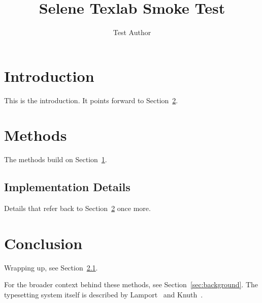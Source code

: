 \documentclass{article}
\title{Selene Texlab Smoke Test}
\author{Test Author}
\begin{document}
\maketitle

\section{Introduction}
\label{sec:intro}
This is the introduction. It points forward to Section~\ref{sec:methods}.

\section{Methods}
\label{sec:methods}
The methods build on Section~\ref{sec:intro}.

\subsection{Implementation Details}
\label{sec:details}
Details that refer back to Section~\ref{sec:methods} once more.

\section{Conclusion}
\label{sec:conclusion}
Wrapping up, see Section~\ref{sec:details}.



For the broader context behind these methods, see Section~\ref{sec:background}.
The typesetting system itself is described by Lamport~\cite{lamport1994} and
Knuth~\cite{knuth1984}.



\end{document}
